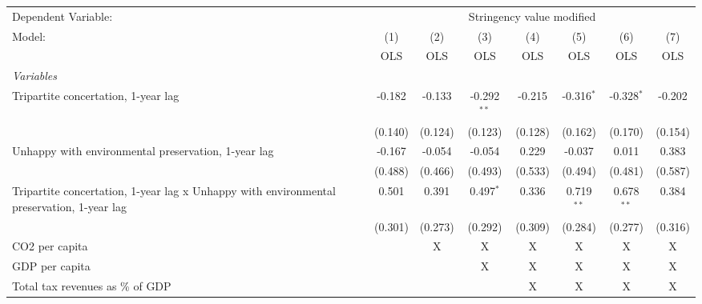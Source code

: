 
\begingroup
\centering
\begin{tabular}{lccccccc}
   \toprule
   Dependent Variable: & \multicolumn{7}{c}{Stringency value modified}\\
   Model:                                                                                    & (1)     & (2)     & (3)           & (4)     & (5)          & (6)          & (7)\\  
                                                                                             &  OLS    & OLS     & OLS           & OLS     & OLS          & OLS          & OLS\\  
   \midrule
   \emph{Variables}\\
   Tripartite concertation, 1-year lag                                                       & -0.182  & -0.133  & -0.292$^{**}$ & -0.215  & -0.316$^{*}$ & -0.328$^{*}$ & -0.202\\   
                                                                                             & (0.140) & (0.124) & (0.123)       & (0.128) & (0.162)      & (0.170)      & (0.154)\\   
   Unhappy with environmental preservation, 1-year lag                                       & -0.167  & -0.054  & -0.054        & 0.229   & -0.037       & 0.011        & 0.383\\   
                                                                                             & (0.488) & (0.466) & (0.493)       & (0.533) & (0.494)      & (0.481)      & (0.587)\\   
   Tripartite concertation, 1-year lag x Unhappy with environmental preservation, 1-year lag & 0.501   & 0.391   & 0.497$^{*}$   & 0.336   & 0.719$^{**}$ & 0.678$^{**}$ & 0.384\\   
                                                                                             & (0.301) & (0.273) & (0.292)       & (0.309) & (0.284)      & (0.277)      & (0.316)\\   
   CO2 per capita                                                                            &         & X       & X             & X       & X            & X            & X\\  
   GDP per capita                                                                            &         &         & X             & X       & X            & X            & X\\  
   Total tax revenues as \% of GDP                                                           &         &         &               & X       & X            & X            & X\\  

\end{tabular}
